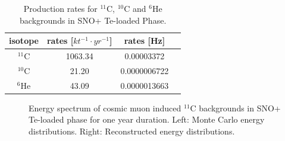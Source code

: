 \begin{table}[ht]
	\caption{Production rates for $^{11}$C, $^{10}$C and $^{6}$He backgrounds in SNO+ Te-loaded Phase.}\label{productionRates}
				\centering	
	\begin{tabular*}{100mm}{c@{\extracolsep{\fill}}ccc}
			\toprule 
			isotope & rates [$kt^{-1}\cdot yr^{-1}$]& rates [Hz]\\
			\midrule
		 $^{11}$C & 1063.34 & 0.00003372\\
		 $^{10}$C & 21.20 & 0.0000006722\\
		 $^{6}$He &43.09& 0.0000013663 \\
			\bottomrule	
	\end{tabular*}
\end{table}

\begin{figure}[htbp]
	\caption{Energy spectrum of cosmic muon induced $^{11}$C backgrounds in SNO+ Te-loaded phase for one year duration. Left: Monte Carlo energy distributions. Right: Reconstructed energy distributions.}
	\label{muon_c11}
\end{figure}

